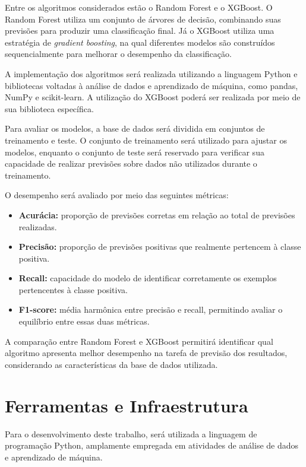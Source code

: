 \documentclass[12pt,a4paper]{report}
\begin{document}
Entre os algoritmos considerados estão o Random Forest e o XGBoost. O Random Forest utiliza um conjunto de árvores de decisão, combinando suas previsões para produzir uma classificação final. Já o XGBoost utiliza uma estratégia de \textit{gradient boosting}, na qual diferentes modelos são construídos sequencialmente para melhorar o desempenho da classificação.

A implementação dos algoritmos será realizada utilizando a linguagem Python e bibliotecas voltadas à análise de dados e aprendizado de máquina, como pandas, NumPy e scikit-learn. A utilização do XGBoost poderá ser realizada por meio de sua biblioteca específica.

Para avaliar os modelos, a base de dados será dividida em conjuntos de treinamento e teste. O conjunto de treinamento será utilizado para ajustar os modelos, enquanto o conjunto de teste será reservado para verificar sua capacidade de realizar previsões sobre dados não utilizados durante o treinamento.

O desempenho será avaliado por meio das seguintes métricas:

\begin{itemize}[leftmargin=2em]
    \item \textbf{Acurácia:} proporção de previsões corretas em relação ao total de previsões realizadas.
    \item \textbf{Precisão:} proporção de previsões positivas que realmente pertencem à classe positiva.
    \item \textbf{Recall:} capacidade do modelo de identificar corretamente os exemplos pertencentes à classe positiva.
    \item \textbf{F1-score:} média harmônica entre precisão e recall, permitindo avaliar o equilíbrio entre essas duas métricas.
\end{itemize}

A comparação entre Random Forest e XGBoost permitirá identificar qual algoritmo apresenta melhor desempenho na tarefa de previsão dos resultados, considerando as características da base de dados utilizada.

\section{Ferramentas e Infraestrutura}

Para o desenvolvimento deste trabalho, será utilizada a linguagem de programação Python, amplamente empregada em atividades de análise de dados e aprendizado de máquina.
\end{document}
